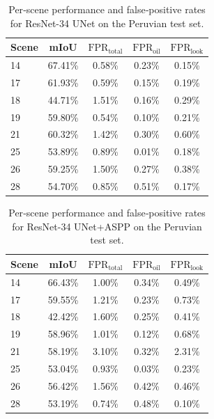 \documentclass[12pt]{article}
\begin{document}
\begin{table}[htbp]
\centering
\caption{Per‐scene performance and false‐positive rates for ResNet-34 UNet on the Peruvian test set.}
\label{tab:resnet34_unet_fpr}
\small
\begin{tabular}{lcccc}
\toprule
\textbf{Scene} & \textbf{mIoU} & \(\mathrm{FPR}_{\mathrm{total}}\) & \(\mathrm{FPR}_{\mathrm{oil}}\) & \(\mathrm{FPR}_{\mathrm{look}}\) \\
\midrule
14 & 67.41\% & 0.58\% & 0.23\% & 0.15\% \\
17 & 61.93\% & 0.59\% & 0.15\% & 0.19\% \\
18 & 44.71\% & 1.51\% & 0.16\% & 0.29\% \\
19 & 59.80\% & 0.54\% & 0.10\% & 0.21\% \\
21 & 60.32\% & 1.42\% & 0.30\% & 0.60\% \\
25 & 53.89\% & 0.89\% & 0.01\% & 0.18\% \\
26 & 59.25\% & 1.50\% & 0.27\% & 0.38\% \\
28 & 54.70\% & 0.85\% & 0.51\% & 0.17\% \\
\bottomrule
\end{tabular}
\end{table}

\begin{table}[htbp]
\centering
\caption{Per‐scene performance and false‐positive rates for ResNet-34 UNet+ASPP on the Peruvian test set.}
\label{tab:resnet34_unet_aspp_fpr}
\small
\begin{tabular}{lcccc}
\toprule
\textbf{Scene} & \textbf{mIoU} & \(\mathrm{FPR}_{\mathrm{total}}\) & \(\mathrm{FPR}_{\mathrm{oil}}\) & \(\mathrm{FPR}_{\mathrm{look}}\) \\
\midrule
14 & 66.43\% & 1.00\% & 0.34\% & 0.49\% \\
17 & 59.55\% & 1.21\% & 0.23\% & 0.73\% \\
18 & 42.42\% & 1.60\% & 0.25\% & 0.41\% \\
19 & 58.96\% & 1.01\% & 0.12\% & 0.68\% \\
21 & 58.19\% & 3.10\% & 0.32\% & 2.31\% \\
25 & 53.04\% & 0.93\% & 0.03\% & 0.23\% \\
26 & 56.42\% & 1.56\% & 0.42\% & 0.46\% \\
28 & 53.19\% & 0.74\% & 0.48\% & 0.10\% \\
\bottomrule
\end{tabular}
\end{table}
\end{document}

